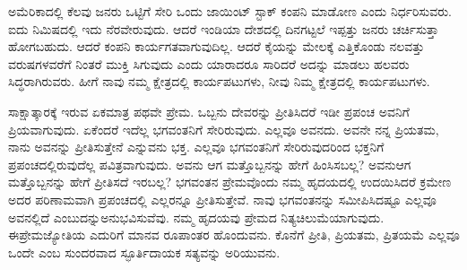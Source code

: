 ಅಮೆರಿಕಾದಲ್ಲಿ ಕೆಲವು ಜನರು ಒಟ್ಟಿಗೆ ಸೇರಿ ಒಂದು ಜಾಯಿಂಟ್​ ಸ್ಟಾಕ್​ ಕಂಪನಿ ಮಾಡೋಣ ಎಂದು ನಿರ್ಧರಿಸುವರು. ಐದು ನಿಮಿಷದಲ್ಲಿ ಇದು ನೆರವೇರುವುದು. ಆದರೆ ಇಂಡಿಯಾ ದೇಶದಲ್ಲಿ ದಿನಗಟ್ಟಲೆ ಇಪ್ಪತ್ತು ಜನರು ಚರ್ಚಿಸುತ್ತಾ ಹೋಗಬಹುದು. ಆದರೆ ಕಂಪನಿ ಕಾರ್ಯಗತವಾಗುವುದಿಲ್ಲ. ಆದರೆ ಕೈಯನ್ನು ಮೇಲಕ್ಕೆ ಎತ್ತಿಕೊಂಡು ನಲವತ್ತು ವರುಷಗಳವರೆಗೆ ನಿಂತರೆ ಮುಕ್ತಿ ಸಿಗುವುದು ಎಂದು ಯಾರಾದರೂ ಸಾರಿದರೆ ಅದನ್ನು ಮಾಡಲು ಹಲವರು ಸಿದ್ಧರಾಗಿರುವರು. ಹೀಗೆ ನಾವು ನಮ್ಮ ಕ್ಷೇತ್ರದಲ್ಲಿ ಕಾರ್ಯಪಟುಗಳು, ನೀವು ನಿಮ್ಮ ಕ್ಷೇತ್ರದಲ್ಲಿ ಕಾರ್ಯಪಟುಗಳು.

ಸಾಕ್ಷಾತ್ಕಾರಕ್ಕೆ ಇರುವ ಏಕಮಾತ್ರ ಪಥವೇ ಪ್ರೇಮ. ಒಬ್ಬನು ದೇವರನ್ನು ಪ್ರೀತಿಸಿದರೆ ಇಡೀ ಪ್ರಪಂಚ ಅವನಿಗೆ ಪ್ರಿಯವಾಗುವುದು. ಏಕೆಂದರೆ ಇದೆಲ್ಲ ಭಗವಂತನಿಗೆ ಸೇರಿರುವುದು. ಎಲ್ಲವೂ ಅವನದು. ಅವನೇ ನನ್ನ ಪ್ರಿಯತಮ, ನಾನು ಅವನನ್ನು ಪ್ರೀತಿಸುತ್ತೇನೆ ಎನ್ನುವನು ಭಕ್ತ. ಎಲ್ಲವೂ ಭಗವಂತನಿಗೆ ಸೇರಿರುವುದರಿಂದ ಭಕ್ತನಿಗೆ ಪ್ರಪಂಚದಲ್ಲಿರುವು\-ದೆಲ್ಲ ಪವಿತ್ರವಾಗುವುದು. ಅವನು ಆಗ ಮತ್ತೊಬ್ಬನನ್ನು ಹೇಗೆ ಹಿಂಸಿಸಬಲ್ಲ? ಅವನು\break ಆಗ ಮತ್ತೊಬ್ಬನನ್ನು ಹೇಗೆ ಪ್ರೀತಿಸದೆ ಇರಬಲ್ಲ? ಭಗವಂತನ ಪ್ರೇಮವೊಂದು ನಮ್ಮ ಹೃದಯದಲ್ಲಿ ಉದಯಿಸಿದರೆ ಕ್ರಮೇಣ ಅದರ ಪರಿಣಾಮವಾಗಿ ಪ್ರಪಂಚದಲ್ಲಿ ಎಲ್ಲರನ್ನೂ ಪ್ರೀತಿಸುತ್ತೇವೆ. ನಾವು ಭಗವಂತನನ್ನು ಸಮೀಪಿಸಿದಷ್ಟೂ ಎಲ್ಲವೂ ಅವನಲ್ಲಿದೆ ಎಂಬುದನ್ನು\break ಅನುಭವಿಸುವೆವು. ನಮ್ಮ ಹೃದಯವು ಪ್ರೇಮದ ನಿತ್ಯಚಿಲುಮೆಯಾಗುವುದು. ಈ\break ಪ್ರೇಮಜ್ಯೋತಿಯ ಎದುರಿಗೆ ಮಾನವ ರೂಪಾಂತರ ಹೊಂದುವನು. ಕೊನೆಗೆ ಪ್ರೀತಿ, ಪ್ರಿಯತಮ, ಪ್ರಿತಯಮೆ ಎಲ್ಲವೂ ಒಂದೇ ಎಂಬ ಸುಂದರವಾದ ಸ್ಫೂರ್ತಿದಾಯಕ ಸತ್ಯವನ್ನು ಅರಿಯುವನು.

